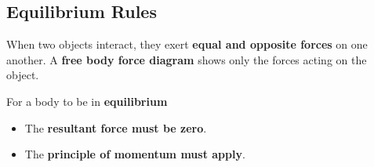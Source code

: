 \subsection{Equilibrium Rules}

When two objects interact, they exert \textbf{equal and opposite forces} on one another. A \textbf{free body force diagram} shows only the forces acting on the object.

For a body to be in \textbf{equilibrium}
\begin{itemize}
    \item The \textbf{resultant force must be zero}.
    \item The \textbf{principle of momentum must apply}.
\end{itemize}
